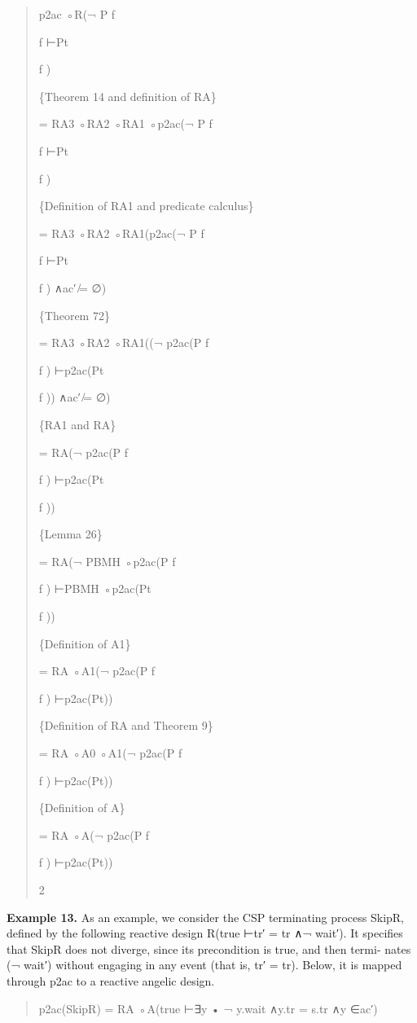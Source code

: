 \documentclass[11pt]{article}
\begin{document}
\begin{quote}\small\raggedright
p2ac ◦R(¬ P f
\par
f ⊢Pt
\par
f )
\par
\{Theorem 14 and definition of RA\}
\par
= RA3 ◦RA2 ◦RA1 ◦p2ac(¬ P f
\par
f ⊢Pt
\par
f )
\par
\{Definition of RA1 and predicate calculus\}
\par
= RA3 ◦RA2 ◦RA1(p2ac(¬ P f
\par
f ⊢Pt
\par
f ) ∧ac′ ̸= ∅)
\par
\{Theorem 72\}
\par
= RA3 ◦RA2 ◦RA1((¬ p2ac(P f
\par
f ) ⊢p2ac(Pt
\par
f )) ∧ac′ ̸= ∅)
\par
\{RA1 and RA\}
\par
= RA(¬ p2ac(P f
\par
f ) ⊢p2ac(Pt
\par
f ))
\par
\{Lemma 26\}
\par
= RA(¬ PBMH ◦p2ac(P f
\par
f ) ⊢PBMH ◦p2ac(Pt
\par
f ))
\par
\{Definition of A1\}
\par
= RA ◦A1(¬ p2ac(P f
\par
f ) ⊢p2ac(Pt))
\par
\{Definition of RA and Theorem 9\}
\par
= RA ◦A0 ◦A1(¬ p2ac(P f
\par
f ) ⊢p2ac(Pt))
\par
\{Definition of A\}
\par
= RA ◦A(¬ p2ac(P f
\par
f ) ⊢p2ac(Pt))
\par
2
\end{quote}

\noindent\textbf{Example 13.} As an example, we consider the CSP terminating process SkipR, defined by the following reactive design R(true ⊢tr′ = tr ∧¬ wait′). It specifies that SkipR does not diverge, since its precondition is true, and then termi- nates (¬ wait′) without engaging in any event (that is, tr′ = tr). Below, it is mapped through p2ac to a reactive angelic design.


\begin{quote}\small\raggedright
p2ac(SkipR) = RA ◦A(true ⊢∃y • ¬ y.wait ∧y.tr = s.tr ∧y ∈ac′)
\end{quote}
\end{document}
